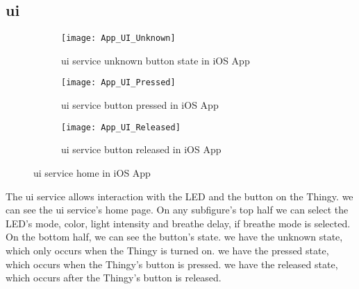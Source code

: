 \subsection{\gls{ui}}
\begin{figure}[hbt!]
	\centering
	\begin{subfigure}{.31\textwidth}
		\centering
		\texttt{[image: App\_UI\_Unknown]}
		\caption{\gls{ui} service unknown button state in iOS App}
		\label{fig:app_ui_unknown}
	\end{subfigure}
	\begin{subfigure}{.31\textwidth}
		\centering
		\texttt{[image: App\_UI\_Pressed]}
		\caption{\gls{ui} service button pressed in iOS App}
		\label{fig:app_ui_pressed}
	\end{subfigure}
	\begin{subfigure}{.31\textwidth}
		\centering
		\texttt{[image: App\_UI\_Released]}
		\caption{\gls{ui} service button released in iOS App}
		\label{fig:app_ui_released}
	\end{subfigure}
	\caption{\gls{ui} service home in iOS App}
	\label{fig:app_ui}
\end{figure}
The \gls{ui} service allows interaction with the LED and the button on the Thingy.	 we can see the \gls{ui} service's home page. On any subfigure's top half we can select the LED's  mode, color, light intensity and breathe delay, if breathe mode is selected. On the bottom half, we can see the button's state.  we have the unknown state, which only occurs when the Thingy is turned on.  we have the pressed state, which occurs when the Thingy's button is pressed.  we have the released state, which occurs after the Thingy's button is released.


